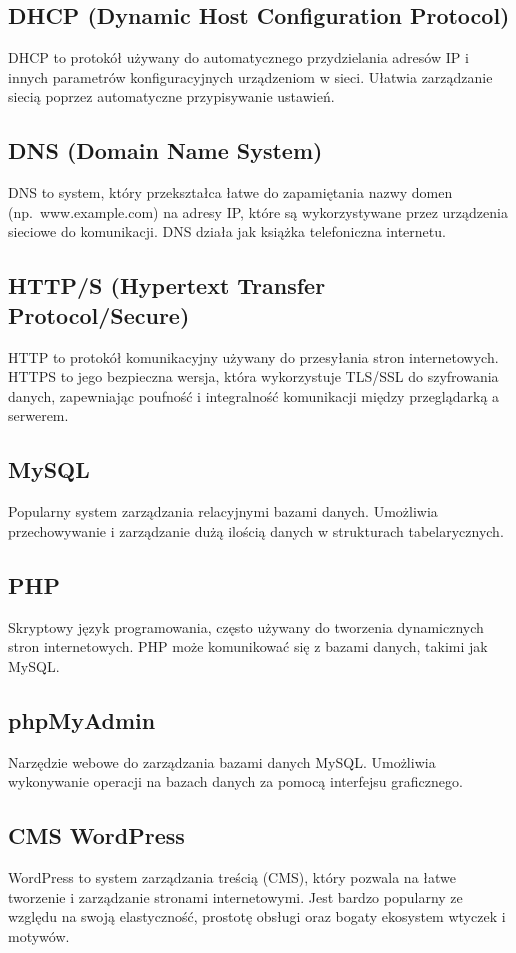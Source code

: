 \documentclass[a4paper]{article}
\begin{document}
\subsection{DHCP (Dynamic Host Configuration Protocol)}
DHCP to protokół używany do automatycznego przydzielania adresów IP i innych parametrów konfiguracyjnych urządzeniom w sieci. Ułatwia zarządzanie siecią poprzez automatyczne przypisywanie ustawień.

\subsection{DNS (Domain Name System)}
DNS to system, który przekształca łatwe do zapamiętania nazwy domen (np.\ www.example.com) na adresy IP, które są wykorzystywane przez urządzenia sieciowe do komunikacji. DNS działa jak książka telefoniczna internetu.

\subsection{HTTP/S (Hypertext Transfer Protocol/Secure)}
HTTP to protokół komunikacyjny używany do przesyłania stron internetowych. HTTPS to jego bezpieczna wersja, która wykorzystuje TLS/SSL do szyfrowania danych, zapewniając poufność i integralność komunikacji między przeglądarką a serwerem.

\subsection{MySQL}
Popularny system zarządzania relacyjnymi bazami danych. Umożliwia przechowywanie i zarządzanie dużą ilością danych w strukturach tabelarycznych.

\subsection{PHP}
Skryptowy język programowania, często używany do tworzenia dynamicznych stron internetowych. PHP może komunikować się z bazami danych, takimi jak MySQL.

\subsection{phpMyAdmin}
Narzędzie webowe do zarządzania bazami danych MySQL.
Umożliwia wykonywanie operacji na bazach danych za pomocą interfejsu graficznego.

\subsection{CMS WordPress}
WordPress to system zarządzania treścią (CMS), który pozwala na łatwe tworzenie i zarządzanie stronami internetowymi. Jest bardzo popularny ze względu na swoją elastyczność, prostotę obsługi oraz bogaty ekosystem wtyczek i motywów.
\end{document}
